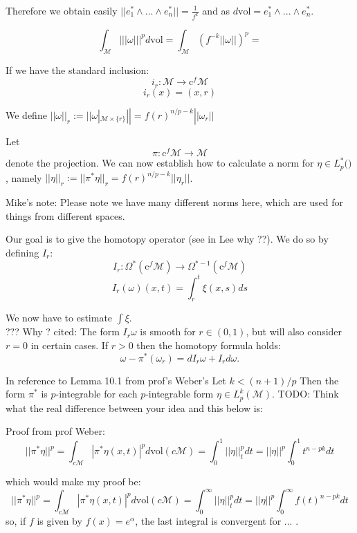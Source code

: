 \documentclass[licencjacka]{pracamgr}
\begin{document}
\normalsize

Therefore we obtain easily $||e_1^{\ast} \wedge ... \wedge e_n^\ast || =
\frac{1}{f^k}$ and as $d\mathrm{vol} = e_1^{\ast} \wedge ... \wedge e_n^\ast $.


\[
    \int_{\mathcal{M}} ||| \omega |||^p d\mathrm{vol} = 
    \int_{\mathcal{M}}  (f^{-k}|| \omega ||)^p =  
\]

If we have the standard inclusion:
\[
    i_r: \mathcal{M} \rightarrow \mathrm{c}^f \mathcal{M}
\]
\[
    i_r(x) = (x, r)
\]

We define $|| \omega ||_r := || \omega |_{\mathcal{M} \times \{r\}} ||
= f(r)^{n/p - k} ||\omega_r||$

Let
\[
    \pi:\mathrm{c}^f \mathcal{M} \rightarrow \mathcal{M}
\]
denote the projection. We can now establish how to calculate a norm
for $\eta \in L^\ast_p(\mathcal)$, namely 
$||\eta||_r := ||\pi^\ast\eta||_r = f(r)^{n/p - k} ||\eta_r||$.


\scriptsize
Mike's note: Please note we have many different norms here, which
are used for things from different spaces.
\normalsize

Our goal is to give the homotopy operator (see in Lee why ??). We do so by
defining $I_r$:
\[
  I_r: \Omega^\ast( \mathrm{c}^f \mathcal{M} ) \rightarrow
  \Omega^{\ast-1}(\mathrm{c}^f \mathcal{M} ) 
\]
\[
    I_r(\omega)(x, t) = \int_r^t \xi(x, s) ds
\]

We now have to estimate $\int \xi$. \\

??? Why ?
cited:
The form $I_r\omega$ is smooth for $r \in (0,1)$, but will also consider
$r=0$ in certain cases. If $r>0$ then the homotopy formula holds:
\[
    \omega - \pi^\ast(\omega_r) = d I_r\omega + I_rd\omega.
\] 

In reference to Lemma 10.1 from prof's Weber's
Let $k < (n+1)/p $ Then the form $\pi^\ast$ is $p$-integrable for each 
$p$-integrable form $\eta \in L^k_p(\mathcal{M})$. TODO: Think what the real
difference between your idea and this below is:

Proof from prof Weber:
\[
    ||\pi^\ast \eta ||^p = 
    \int_{c \mathcal{M}} |\pi^\ast \eta(x,t)|^p d \mathrm{vol}(c\mathcal{M}) = 
    \int_0^1 ||\eta||_t^p dt = ||\eta||^p \int_0^1t^{n-pk} dt
\]

which would make my proof be:
\[
    ||\pi^\ast \eta ||^p = 
    \int_{c \mathcal{M}} |\pi^\ast \eta(x,t)|^p d \mathrm{vol}(c\mathcal{M}) = 
    \int_0^\infty ||\eta||_t^p dt = ||\eta||^p \int_0^\infty f(t)^{n-pk} dt
\]
so, if $f$ is given by $f(x) = e^\alpha$, the last integral is convergent
for ... . \\
\end{document}
